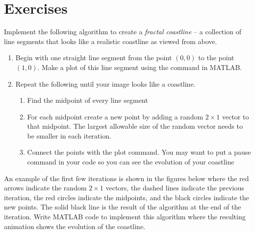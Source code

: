 \newpage\section{Exercises}

\begin{problem}
    Implement the following algorithm to create a {\it fractal coastline} -- a collection
    of line
    segments that looks like a realistic coastline as viewed from above.
    \begin{enumerate}
        \item Begin with one straight line segment from the point $(0,0)$ to the point
            $(1,0)$.  Make a plot of this line segment using the  command in MATLAB.
        \item Repeat the following until your image looks like a coastline.
            \begin{enumerate}
                \item Find the midpoint of every line segment
                \item For each midpoint create a new point by adding a random $2 \times 1$ vector to that
                    midpoint.  The largest allowable size of the random vector needs to be
                    smaller in each iteration.
                \item Connect the points with the plot command.  You may want to put a
                    pause command in your code so you can see the evolution of your
                    coastline
            \end{enumerate}
    \end{enumerate}
    An example of the first few iterations is shown in the figures below where the red arrows indicate
    the random $2 \times 1$ vectors, the dashed lines indicate the previous iteration, the
    red circles indicate the midpoints, and the black circles indicate the new points.  The
    solid black line is the result of the algorithm at the end of the iteration.  Write
    MATLAB code to implement this algorithm where the resulting animation shows the
    evolution of the coastline. 
\end{problem}
